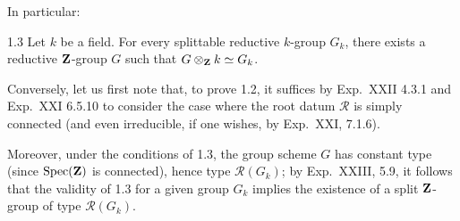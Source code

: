 In particular:
\begin{corollary}{1.3}\label{XXV.1.3}
Let $k$ be a field. For every splittable reductive $k$-group $G_k$, there exists a reductive $\mathbf{Z}$-group $G$ such that $G\otimes_{\mathbf{Z}} k\simeq G_k$.
\end{corollary}
Conversely, let us first note that, to prove 1.2, it suffices by Exp.~XXII 4.3.1 and Exp.~XXI 6.5.10 to consider the case where the root datum $\mathscr R$ is simply connected (and even irreducible, if one wishes, by Exp.~XXI, 7.1.6).

Moreover, under the conditions of 1.3, the group scheme $G$ has constant type (since $\operatorname{Spec}(\mathbf{Z})$ is connected), hence type $\mathscr R(G_k)$; by Exp.~XXIII, 5.9, it follows that the validity of 1.3 for a given group $G_k$ implies the existence of a split $\mathbf{Z}$-group of type $\mathscr R(G_k)$.

